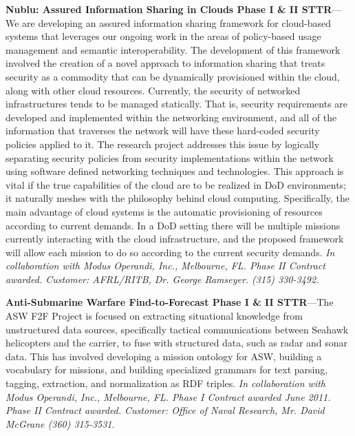 \documentclass{sbir}
\begin{document}
{\bf Nublu: Assured Information Sharing in Clouds Phase I \& II STTR}---We are developing an assured information sharing framework for cloud-based systems that leverages our ongoing work in the areas of policy-based usage management and semantic interoperability. The development of this framework involved the creation of a novel approach to information sharing that treats security as a commodity that can be dynamically provisioned within the cloud, along with other cloud resources. Currently, the security of networked infrastructures tends to be managed statically. That is, security requirements are developed and implemented within the networking environment, and all of the information that traverses the network will have these hard-coded security policies applied to it. The research project addresses this issue by logically separating security policies from security implementations within the network using software defined networking techniques and technologies. This approach is vital if the true capabilities of the cloud are to be realized in DoD environments; it naturally meshes with the philosophy behind cloud computing. Specifically, the main advantage of cloud systems is the automatic provisioning of resources according to current demands. In a DoD setting there will be multiple missions currently interacting with the cloud infrastructure, and the proposed framework will allow each mission to do so according to the current security demands. \emph{In collaboration with Modus Operandi, Inc., Melbourne, FL. Phase II Contract awarded. Customer: AFRL/RITB, Dr. George Ramseyer. (315) 330-3492}.

{\bf Anti-Submarine Warfare Find-to-Forecast Phase I \& II STTR}---The ASW F2F Project is focused on extracting situational knowledge from unstructured data sources, specifically tactical communications between Seahawk helicopters and the carrier, to fuse with structured data, such as radar and sonar data. This has involved developing a mission ontology for ASW, building a vocabulary for missions, and building specialized grammars for text parsing, tagging, extraction, and normalization as RDF triples. \emph{In collaboration with Modus Operandi, Inc., Melbourne, FL. Phase I Contract awarded June 2011. Phase II Contract awarded. Customer: Office of Naval Research, Mr. David McGrane (360) 315-3531}.
\end{document}
